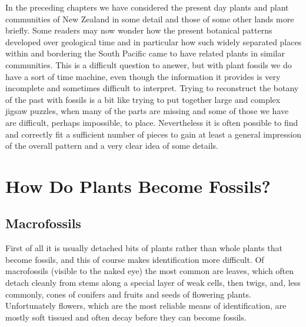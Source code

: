 In the preceding chapters we have considered the present day plants and plant communities of New Zealand in some detail and those of some other lands more briefly.
Some readers may now wonder how the present botanical patterns developed over geological time and in particular how such widely separated places within and bordering the South Pacific came to have related plants in similar communities.
This is a difficult question to answer, but with plant fossils we do have a sort of time machine, even though the information it provides is very incomplete and sometimes difficult to interpret.
Trying to reconstruct the botany of the past with fossils is a bit like trying to put together large and complex jigsaw puzzles, when many of the parts are missing and some of those we have are difficult, perhaps impossible, to place.
Nevertheless it is often possible to find and correctly fit a sufficient number of pieces to gain at least a general impression of the overall pattern and a very clear idea of some details.

\section{How Do Plants Become Fossils?}

\subsection{Macrofossils}

First of all it is usually detached bits of plants rather than whole plants that become fossils, and this of course makes identification more difficult.
Of macrofossils (visible to the naked eye) the most common are leaves, which often detach cleanly from stems along a special layer of weak cells, then twigs, and, less commonly, cones of conifers and fruits and seeds of flowering plants.
Unfortunately flowers, which are the most reliable means of identification, are mostly soft tissued and often decay before they can become fossils.

